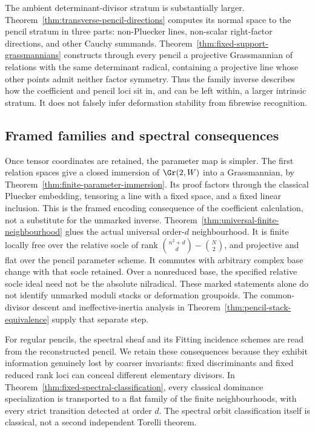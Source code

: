 The ambient determinant-divisor stratum is substantially larger.
Theorem~\ref{thm:transverse-pencil-directions} computes its normal
space to the pencil stratum in three parts: non-Pluecker lines,
non-scalar right-factor directions, and other Cauchy summands.
Theorem~\ref{thm:fixed-support-grassmannians} constructs through every
pencil a projective Grassmannian of relations with the same determinant
radical, containing a projective line whose other points admit neither
factor symmetry.  Thus the family inverse describes how the
coefficient and pencil loci sit in, and can be left within, a larger
intrinsic stratum.  It does not falsely infer deformation stability
from fibrewise recognition.

\subsection{Framed families and spectral consequences}
Once tensor coordinates are retained, the parameter map is simpler.
The first relation spaces give a closed immersion of
\(\Gr(2,W)\) into a Grassmannian, by
Theorem~\ref{thm:finite-parameter-immersion}.  Its proof factors through
the classical Pluecker embedding, tensoring a line with a fixed space,
and a fixed linear inclusion.  This is the framed encoding consequence
of the coefficient calculation, not a substitute for the unmarked
inverse.  Theorem~\ref{thm:universal-finite-neighbourhood} glues the
actual universal order-\(d\) neighbourhood.  It is finite locally
free over the relative socle of rank
\(\binom{n^2+d}{d}-\binom N2\), and projective and flat over the
pencil parameter scheme.  It commutes with arbitrary complex base
change with that socle retained.  Over a nonreduced base, the specified
relative socle ideal need not be the absolute nilradical.  These marked statements alone do not identify unmarked moduli
stacks or deformation groupoids.  The common-divisor descent and
ineffective-inertia analysis in
Theorem~\ref{thm:pencil-stack-equivalence} supply that separate step.

For regular pencils, the spectral sheaf and its Fitting incidence
schemes are read from the reconstructed pencil.  We retain these
consequences because they exhibit information genuinely lost by
coarser invariants: fixed discriminants and fixed reduced rank loci
can conceal different elementary divisors.  In
Theorem~\ref{thm:fixed-spectral-classification}, every classical
dominance specialization is transported to a flat family of the
finite neighbourhoods, with every strict transition detected at
order \(d\).  The spectral orbit classification itself is classical,
not a second independent Torelli theorem.

